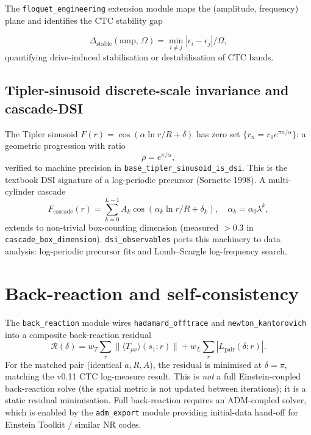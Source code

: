 \documentclass[11pt,a4paper]{article}
\begin{document}
The \texttt{floquet\_engineering} extension module maps the
(amplitude, frequency) plane and identifies the CTC stability gap

\begin{equation}
\Delta_{\text{stable}}(\text{amp},\,\Omega)
  = \min_{i \ne j} |\epsilon_i - \epsilon_j| / \Omega,
\end{equation}
quantifying drive-induced stabilisation or destabilisation of CTC
bands.

\subsection{Tipler-sinusoid discrete-scale invariance and cascade-DSI}

The Tipler sinusoid $F(r) = \cos(\alpha \ln r/R + \delta)$ has
zero set $\{r_n = r_0 e^{\pi n / \alpha}\}$: a geometric progression
with ratio
\begin{equation}
\rho = e^{\pi / \alpha},
\end{equation}
verified to machine precision in \texttt{base\_tipler\_sinusoid\_is\_dsi}.
This is the textbook DSI signature of a log-periodic precursor
(Sornette 1998). A multi-cylinder cascade
\begin{equation}
F_{\text{cascade}}(r) = \sum_{k=0}^{L-1} A_k \cos(\alpha_k \ln r/R + \delta_k),
\quad \alpha_k = \alpha_0 \lambda^k,
\end{equation}
extends to non-trivial box-counting dimension (measured $> 0.3$ in
\texttt{cascade\_box\_dimension}). \texttt{dsi\_observables} ports
this machinery to data analysis: log-periodic precursor fits and
Lomb--Scargle log-frequency search.

\section{Back-reaction and self-consistency}

The \texttt{back\_reaction} module wires \texttt{hadamard\_offtrace}
and \texttt{newton\_kantorovich} into a composite back-reaction
residual
\begin{equation}
\mathcal{R}(\delta) = w_T \sum_r \|\langle T_{\mu\nu} \rangle(s_1; r)\|
  + w_L \sum_r |L_{\text{pair}}(\delta; r)|.
\end{equation}
For the matched pair (identical $a, R, A$), the residual is
minimised at $\delta = \pi$, matching the v0.11 CTC log-measure
result. This is \emph{not} a full Einstein-coupled back-reaction
solve (the spatial metric is not updated between iterations); it is
a static residual minimisation. Full back-reaction requires an
ADM-coupled solver, which is enabled by the \texttt{adm\_export}
module providing initial-data hand-off for Einstein Toolkit / similar
NR codes.
\end{document}
